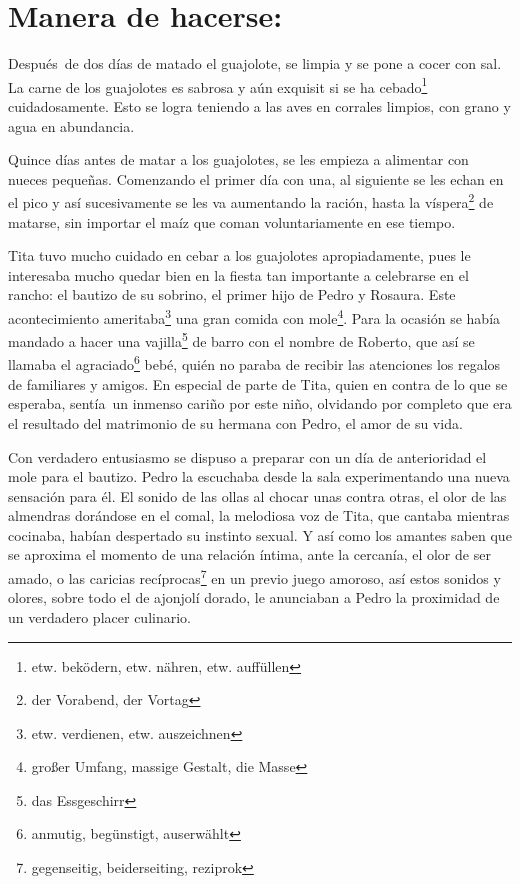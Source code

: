\section*{ Manera de hacerse: }
Después~de dos días de matado el guajolote, se limpia y se pone a
cocer con sal. La carne de los guajolotes es sabrosa y aún exquisit si
se ha cebado\footnote{etw. beködern, etw. nähren, etw. auffüllen}
cuidadosamente. Esto se logra teniendo a las aves en corrales limpios,
con grano y agua en abundancia.

Quince días antes de matar a los guajolotes, se les empieza a alimentar con
nueces pequeñas. Comenzando el primer día con una, al siguiente se les
echan en el pico y así sucesivamente se les va aumentando la ración,
hasta la víspera\footnote{der Vorabend, der Vortag} de matarse,
sin importar el maíz que coman voluntariamente en ese tiempo.

Tita tuvo mucho cuidado en cebar a los guajolotes apropiadamente, pues
le interesaba mucho quedar bien en la fiesta tan importante a celebrarse
en el rancho: el bautizo de su sobrino, el primer hijo de Pedro y
Rosaura. Este acontecimiento ameritaba\footnote{etw. verdienen, etw. auszeichnen}
una gran comida con mole\footnote{großer Umfang, massige Gestalt, die Masse}.
Para la ocasión se había mandado a hacer una vajilla\footnote{das Essgeschirr}
de barro con el nombre de Roberto, que así se llamaba el agraciado\footnote{anmutig, begünstigt, auserwählt} bebé,
quién no paraba de recibir las atenciones los regalos de familiares y amigos.
En especial de parte de Tita, quien en contra de lo que se esperaba,
sentía~un inmenso cariño por este niño, olvidando por completo que era el
resultado del matrimonio de su hermana con Pedro, el amor de su vida.

Con verdadero entusiasmo se dispuso a preparar con un día de
anterioridad el mole para el bautizo. Pedro la escuchaba desde la sala
experimentando una nueva sensación para él. El sonido de las ollas al
chocar unas contra otras, el olor de las almendras dorándose en el
comal, la melodiosa voz de Tita, que cantaba mientras cocinaba, habían
despertado su instinto sexual. Y así como los amantes saben que se
aproxima el momento de una relación íntima, ante la cercanía, el olor de
ser amado, o las caricias recíprocas\footnote{gegenseitig, beiderseiting, reziprok}
en un previo juego amoroso, así estos sonidos y olores, sobre todo el de
ajonjolí dorado, le anunciaban a Pedro la proximidad de un verdadero
placer culinario.

